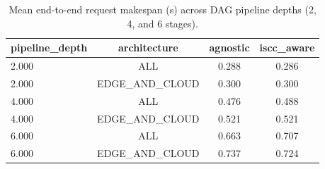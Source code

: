 \begin{table}[t]
\centering
\small
\caption{Mean end-to-end request makespan (s) across DAG pipeline depths (2, 4, and 6 stages).}
\label{tab:p5-depth}
\begin{tabular}{lccc}
\toprule
pipeline\_depth & architecture & agnostic & iscc\_aware \\
\midrule
2.000 & ALL & 0.288 & 0.286 \\
2.000 & EDGE\_AND\_CLOUD & 0.300 & 0.300 \\
4.000 & ALL & 0.476 & 0.488 \\
4.000 & EDGE\_AND\_CLOUD & 0.521 & 0.521 \\
6.000 & ALL & 0.663 & 0.707 \\
6.000 & EDGE\_AND\_CLOUD & 0.737 & 0.724 \\
\bottomrule
\end{tabular}
\end{table}
